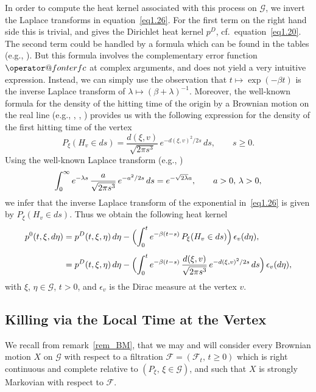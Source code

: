 \documentclass[11pt,a4paper]{amsart}
\makeatletter
\newcommand{\gb}{\beta}
\newcommand{\gep}{\epsilon}
\newcommand{\gl}{\lambda}
\newcommand{\cF}{\mathcal{F}}
\newcommand{\cG}{\mathcal{G}}
\newcommand{\1}{1}
\theoremstyle{remark}
\newcommand{\erfc}{\mathop{\operator@font erfc}\nolimits}
\newcommand{\sgl}{\ensuremath\sqrt{2\gl}}
\numberwithin{equation}{section}
\makeatother
\begin{document}
In order to compute the heat kernel associated with this process on $\cG$, we invert
the Laplace transforms in equation~\eqref{eq1.26}. For the first term on the right
hand side this is trivial, and gives the Dirichlet heat kernel $p^D$, cf.\
equation~\eqref{eq1.20}. The second term could be handled by a formula which can be
found in the tables (e.g., \cite[eq.~(5.6.10)]{ErMa54a}). But this formula involves
the complementary error function $\erfc$ at complex arguments, and does not yield a
very intuitive expression. Instead, we can simply use the observation that
$t\mapsto \exp(-\gb t)$ is the inverse Laplace transform of $\gl\mapsto (\gb+\gl)^{-1}$.
Moreover, the well-known formula for the density of the hitting time of the origin
by a Brownian motion on the real line (e.g., \cite[p.~25]{ItMc74}, \cite[p.~96]{KaSh91},
\cite[p.~102]{ReYo91})
provides us with the following expression for the density of the first hitting time of the vertex
\begin{equation}	\label{DFT}
	P_\xi(H_v\in ds) = \frac{d(\xi,v)}{\sqrt{2\pi s^3}}\,e^{-d(\xi,v)^2/2s}\,ds,\qquad s\ge 0.
\end{equation}
Using the well-known Laplace transform (e.g., \cite[eq.~(4.5.28)]{ErMa54a})
\begin{equation}    \label{LT}
    \int_0^\infty e^{-\gl s}\,\frac{a}{\sqrt{2\pi s^3}}\,e^{-a^2/2s}\,ds
        = e^{-\sgl a},\qquad a>0,\,\gl>0,
\end{equation}
we infer that the inverse Laplace transform of the exponential in~\eqref{eq1.26}
is given by $P_\xi(H_v\in ds)$. Thus we obtain the following heat kernel
\begin{equation}    \label{eq1.27}
\begin{split}
    p^0(t,\xi,d\eta)
        &= p^D(t,\xi,\eta)\,d\eta - \Bigl(\int_0^t e^{-\gb(t-s)}
                        \,P_\xi(H_v\in ds)\Bigr)\,\gep_v(d\eta),\\[1ex]
        &= p^D(t,\xi,\eta)\,d\eta - \Bigl(\int_0^t e^{-\gb(t-s)}
                \,\frac{d(\xi,v)}{\sqrt{2\pi s^3}}\,e^{-d(\xi,v)^2/2s}\,ds\Bigr)\,\gep_v(d\eta),
\end{split}
\end{equation}
with $\xi$, $\eta\in\cG$, $t>0$, and $\gep_v$ is the Dirac measure at the vertex $v$.

\subsection{Killing via the Local Time at the Vertex}    \label{ssect1.5}
We recall from remark~\ref{rem_BM}, that we may and will consider every Brownian
motion $X$ on $\cG$ with respect to a filtration $\cF = (\cF_t,\,t\ge 0)$ which is
right continuous and complete relative to $(P_\xi,\,\xi\in\cG)$, and such that
$X$ is strongly Markovian with respect to $\cF$.
\end{document}
